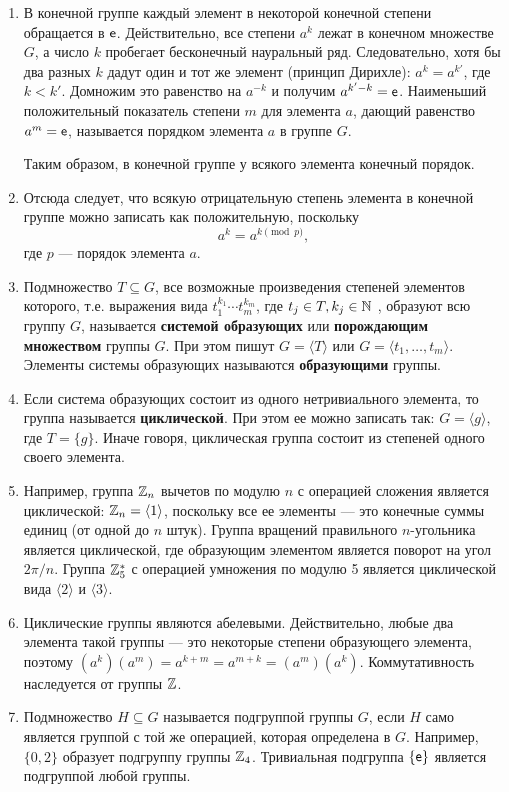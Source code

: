 \begin{enumerate}
\item В конечной группе каждый элемент в некоторой конечной степени обращается в $\mathsf e$. Действительно, все степени $a^k$ лежат в конечном множестве $G$, а число $k$ пробегает бесконечный науральный ряд. Следовательно, хотя бы два разных $k$ дадут один и тот же элемент (принцип Дирихле): $a^k=a^{k'}$, где $k<k'$. Домножим это равенство на $a^{-k}$ и получим $a^{k'-k}=\mathsf e$. Наименьший положительный показатель степени $m$ для элемента $a$, дающий равенство $a^m=\mathsf e$, называется порядком элемента $a$ в группе $G$.

Таким образом, в конечной группе у всякого элемента конечный порядок.

\item Отсюда следует, что всякую отрицательную степень элемента в конечной группе можно записать как положительную, поскольку
$$
a^k = a^{k\pmod p},
$$
где $p$ --- порядок элемента $a$.

\item Подмножество $T\subseteq G$, все возможные произведения степеней элементов которого, т.е. выражения вида $t_1^{k_1}\cdots t_m^{k_m}$, где $t_j\in T, k_j\in\mathbb N$ , образуют всю группу $G$, называется \textbf{системой образующих} или \textbf{порождающим множеством} группы $G$. При этом пишут $G=\langle T\rangle$ или $G=\langle t_1,\dots,t_m\rangle$. Элементы системы образующих называются \textbf{образующими} группы.
\item Если система образующих состоит из одного нетривиального элемента, то группа называется \textbf{циклической}. При этом ее можно записать так: $G=\langle g\rangle$, где $T=\{g\}$. Иначе говоря, циклическая группа состоит из степеней одного своего элемента.
\item Например, группа $\mathbb Z_n$ вычетов по модулю $n$ с операцией сложения является циклической: $\mathbb Z_n=\langle 1\rangle$, поскольку все ее элементы --- это конечные суммы единиц (от одной до $n$ штук). Группа вращений правильного $n$-угольника является циклической, где образующим элементом является поворот на угол $2\pi/n$. Группа $\mathbb Z_5^*$ с операцией умножения по модулю 5 является циклической вида $\langle 2\rangle$ и $\langle 3\rangle$.
\item Циклические группы являются абелевыми. Действительно, любые два элемента такой группы --- это некоторые степени образующего элемента, поэтому $(a^k)(a^m)=a^{k+m}=a^{m+k}=(a^m)(a^k)$. Коммутативность наследуется от группы $\mathbb Z$.

\item Подмножество $H\subseteq G$ называется подгруппой группы $G$, если $H$ само является группой с той же операцией, которая определена в $G$. Например, $\{0,2\}$ образует подгруппу группы $\mathbb Z_4$. Тривиальная подгруппа $\{\mathsf e\}$ является подгруппой любой группы.


\end{enumerate}
